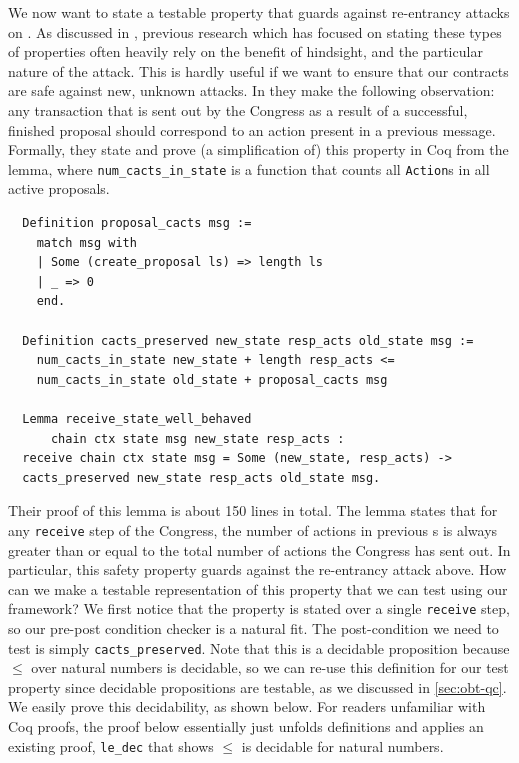 \documentclass[twoside,11pt,openright]{report}
\newenvironment{code}{\captionsetup{type=figure, singlelinecheck=off, justification=raggedleft}}{}
\newcommand{\coq}[1]{\texttt{#1}}
\begin{document}
We now want to state a testable property that guards against re-entrancy attacks on \finishproposal{}. As discussed in \cite{nielsen2019smart}, previous research which has focused on stating these types of properties often heavily rely on the benefit of hindsight, and the particular nature of the attack. This is hardly useful if we want to ensure that our contracts are safe against new, unknown attacks. In \cite{nielsen2019smart} they make the following observation: any transaction that is sent out by the Congress as a result of a successful, finished proposal should correspond to an action present in a previous \createproposal{} message. Formally, they state and prove (a simplification of) this property in Coq from the lemma, where \coq{num\_cacts\_in\_state} is a function that counts all \coq{Action}s in all active proposals.
\begin{code}
\label{def:cacts_preserved-receive_state_well_behaved}
\begin{verbatim}
  Definition proposal_cacts msg := 
    match msg with
    | Some (create_proposal ls) => length ls
    | _ => 0
    end.
  
  Definition cacts_preserved new_state resp_acts old_state msg :=
    num_cacts_in_state new_state + length resp_acts <=
    num_cacts_in_state old_state + proposal_cacts msg
    
  Lemma receive_state_well_behaved
      chain ctx state msg new_state resp_acts :
  receive chain ctx state msg = Some (new_state, resp_acts) ->
  cacts_preserved new_state resp_acts old_state msg.
\end{verbatim}
\end{code}
 Their proof of this lemma is about 150 lines in total. The lemma states that for any \coq{receive} step of the Congress, the number of actions in previous \createproposal{}s is always greater than or equal to the total number of actions the Congress has sent out. In particular, this safety property guards against the re-entrancy attack above. How can we make a testable representation of this property that we can test using our framework? We first notice that the property is stated over a single \coq{receive} step, so our pre-post condition checker is a natural fit. The post-condition we need to test is simply \coq{cacts\_preserved}. Note that this is a decidable proposition because $\le$ over natural numbers is decidable, so we can re-use this definition for our test property since decidable propositions are testable, as we discussed in \autoref{sec:obt-qc}. We easily prove this decidability, as shown below. For readers unfamiliar with Coq proofs, the proof below essentially just unfolds definitions and applies an existing proof, \coq{le\_dec} that shows $\le$ is decidable for natural numbers.
\end{document}
